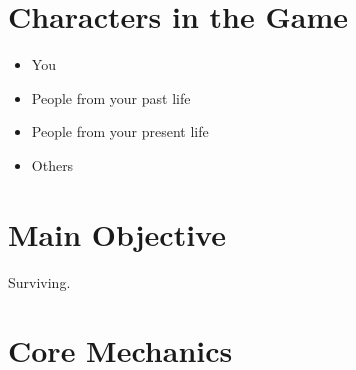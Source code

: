 \documentclass[a4paper]{scrreprt}
\begin{document}
\section{Characters in the Game}
\begin{itemize}
	\item You
	\item People from your past life
	\item People from your present life
	\item Others
\end{itemize}

\section{Main Objective}
Surviving.

\section{Core Mechanics}
\end{document}
